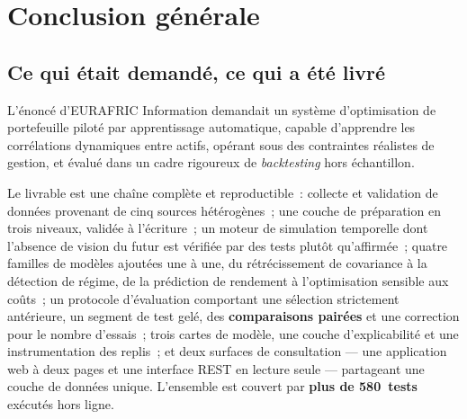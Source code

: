%

\chapter*{Conclusion générale}
\label{chap:conclusion}

\section*{Ce qui était demandé, ce qui a été livré}

L'énoncé d'EURAFRIC Information demandait un système d'optimisation de
portefeuille piloté par apprentissage automatique, capable d'apprendre les
corrélations dynamiques entre actifs, opérant sous des contraintes réalistes de
gestion, et évalué dans un cadre rigoureux de \emph{backtesting} hors
échantillon.

Le livrable est une chaîne complète et reproductible~: collecte et validation de
données provenant de cinq sources hétérogènes~; une couche de préparation en
trois niveaux, validée à l'écriture~; un moteur de simulation temporelle dont
l'absence de vision du futur est vérifiée par des tests plutôt qu'affirmée~;
quatre familles de modèles ajoutées une à une, du rétrécissement de covariance à
la détection de régime, de la prédiction de rendement à l'optimisation sensible
aux coûts~; un protocole d'évaluation comportant une sélection strictement
antérieure, un segment de test gelé, des \textbf{comparaisons pairées} et une
correction pour le nombre d'essais~; trois cartes de modèle, une couche
d'explicabilité et une instrumentation des replis~; et deux surfaces de
consultation — une application web à deux pages et une interface REST en lecture
seule — partageant une couche de données unique. L'ensemble est couvert par
\textbf{plus de 580~tests} exécutés hors ligne.

